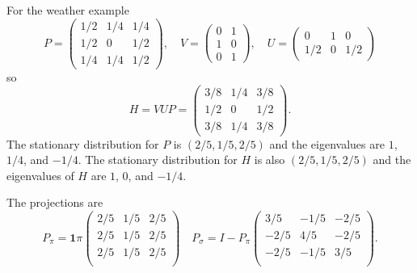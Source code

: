 \documentclass[12pt]{article}
\begin{document}
  \begin{example}
    For the weather example
    \[
      P = \begin{pmatrix}
            1/2 & 1/4 & 1/4 \\
            1/2 & 0 & 1/2 \\
            1/4 & 1/4 & 1/2
          \end{pmatrix},
         \quad 
      V = \begin{pmatrix}
            0 & 1 \\
            1 & 0 \\
            0 & 1
          \end{pmatrix},
          \quad
      U = \begin{pmatrix}
            0 & 1 & 0 \\
            1/2 & 0 & 1/2
        \end{pmatrix}
    \]    
    so
    \[
      H = VUP =
      \begin{pmatrix}
        3/8 & 1/4 & 3/8 \\
        1/2 & 0   & 1/2 \\
        3/8 & 1/4 & 3/8
      \end{pmatrix}
      .
      \]
      The stationary distribution for \( P \) is \( (2/5, 1/5, 2/5) \)
      and the eigenvalues are \( 1 \), \(1/4\), and \(-1/4 \).  The
      stationary distribution for \( H \) is also \( (2/5, 1/5, 2/5)
      \) and the eigenvalues of \( H \) are \( 1 \), \( 0 \), and \(
      -1/4 \).

      The projections are
      \[
        P_{\pi} = \mathbf{1} \pi
        \begin{pmatrix}
          2/5 & 1/5 & 2/5 \\
          2/5 & 1/5 & 2/5 \\
          2/5 & 1/5 & 2/5 \\
        \end{pmatrix}
        \quad
        P_{\sigma} = I - P_{\pi}
        \begin{pmatrix}
          3/5 & -1/5 & -2/5 \\
          -2/5 & 4/5 & -2/5 \\
          -2/5 & -1/5 & 3/5 \\
        \end{pmatrix}
        .
      \]


\end{example}
\end{document}
